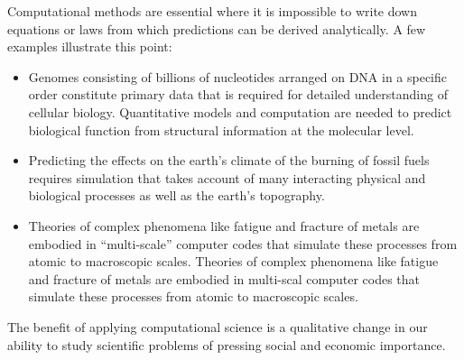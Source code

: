 \documentclass{article}
\begin{document}
Computational methods are essential where it is impossible to write down equations or laws from which predictions can be derived analytically. A few examples illustrate this point:
\begin{itemize}
\item Genomes consisting of billions of nucleotides arranged on DNA in a specific order constitute primary data that is required for detailed understanding of  cellular biology. Quantitative models and computation are needed to predict biological function from structural information at the molecular level.
\item Predicting the effects on the earth's climate of the burning of fossil fuels requires simulation that takes account of many interacting physical and biological processes as well as the earth's topography.
\item Theories of complex phenomena like fatigue and fracture of metals are embodied in “multi-scale” computer codes that simulate these processes from atomic to macroscopic scales.
Theories of complex phenomena like fatigue and fracture of metals are embodied in multi-scal computer codes that simulate these processes from atomic to macroscopic scales.
\end{itemize}
The benefit of applying computational science is a qualitative change in our ability to study scientific problems of pressing social and economic importance.
\end{document}
